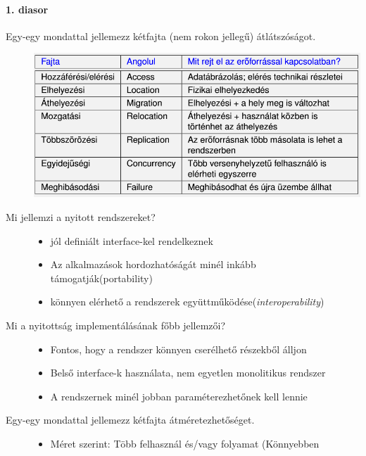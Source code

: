 \documentclass[12pt]{article}
\begin{document}
    \paragraph{1. diasor}
    \begin{description}
        \item[Egy-egy mondattal jellemezz kétfajta (nem rokon jellegű)
            átlátszóságot.]
            \includegraphics[scale=0.5]{images/P5.PNG}
        \item[Mi jellemzi a nyitott rendszereket?]
            \begin{itemize}
                \item jól definiált interface-kel rendelkeznek 
                \item Az alkalmazások hordozhatóságát minél inkább
                    támogatják(portability)
                \item könnyen elérhető a rendszerek
                    együttműködése(\textit{interoperability})
            \end{itemize}
        \item[Mi a nyitottság implementálásának főbb jellemzői?]
            \hfill
            \begin{itemize}
                \item Fontos, hogy a rendszer könnyen cserélhető részekből álljon
                \item Belső interface-k használata, nem egyetlen monolitikus
                    rendszer
                \item A rendszernek minél jobban paraméterezhetőnek kell lennie
            \end{itemize}
        \item[Egy-egy mondattal jellemezz kétfajta átméretezhetőséget.]
            \hfill
            \begin{itemize}
                \item Méret szerint: Több felhasznál és/vagy folyamat  (Könnyebben

\end{itemize}
\end{description}
\end{document}
